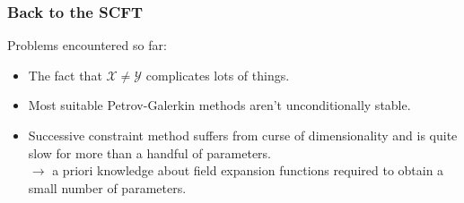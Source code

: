 \begin{frame}[t]
    \frametitle{Back to the SCFT}

    Problems encountered so far:

    \begin{itemize}
        \item<1-> The fact that $\mathcal X \neq \mathcal Y$ complicates lots of things.
        \item<2-> Most suitable Petrov-Galerkin methods aren't unconditionally stable.
        \item<3-> Successive constraint method suffers from curse of dimensionality and is quite slow for more than a handful of parameters.
        \\ $\rightarrow$ a priori knowledge about field expansion functions required to obtain a small number of parameters.
    \end{itemize}

\end{frame}
